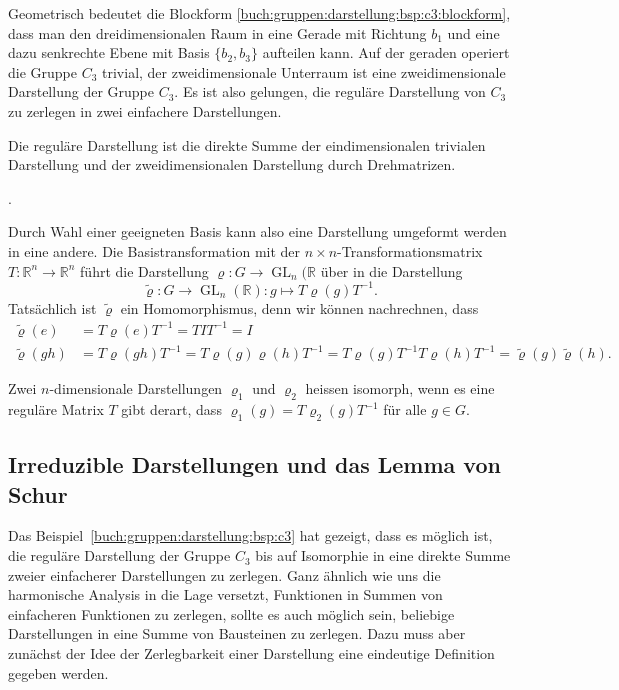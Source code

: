 \begin{beispiel}
Geometrisch bedeutet die Blockform
\eqref{buch:gruppen:darstellung:bsp:c3:blockform}, dass man den
dreidimensionalen Raum in eine Gerade mit Richtung $b_1$ und
eine dazu senkrechte Ebene mit Basis $\{b_2,b_3\}$ aufteilen
kann.
Auf der geraden operiert die Gruppe $C_3$ trivial, der zweidimensionale
Unterraum ist eine zweidimensionale Darstellung der Gruppe $C_3$.
Es ist also gelungen, die reguläre Darstellung von $C_3$ zu zerlegen
in zwei einfachere Darstellungen.

Die reguläre Darstellung ist die direkte Summe der eindimensionalen
trivialen Darstellung und der zweidimensionalen Darstellung durch
Drehmatrizen.
\end{beispiel}.

Durch Wahl einer geeigneten Basis kann also eine Darstellung umgeformt
werden in eine andere.
Die Basistransformation mit der $n\times n$-Transformationsmatrix
$T:\mathbb{R}^n\to\mathbb{R}^n$ führt die 
Darstellung $\varrho\colon G\to\operatorname{GL}_n(\mathbb{R}$ über
in die Darstellung
\[
\tilde{\varrho}
\colon
G\to\operatorname{GL}_n(\mathbb{R})
:
g\mapsto T\varrho(g)T^{-1}.
\]
Tatsächlich ist $\tilde{\varrho}$ ein Homomorphismus, denn wir können
nachrechnen, dass
\begin{align*}
\tilde{\varrho}(e)
&=
T\varrho(e)T^{-1}
=
TIT^{-1}
=
I
\\
\tilde{\varrho}(gh)
&=
T\varrho(gh)T^{-1}
=
T\varrho(g)\varrho(h)T^{-1}
=
T\varrho(g)T^{-1}T\varrho(h)T^{-1}
=
\tilde{\varrho}(g)
\tilde{\varrho}(h).
\end{align*}

\begin{definition}
Zwei $n$-dimensionale Darstellungen $\varrho_1$ und $\varrho_2$
heissen isomorph, wenn es eine reguläre Matrix $T$ gibt derart, dass
$\varrho_1(g)=T\varrho_2(g)T^{-1}$ für alle $g\in G$.
\end{definition}

%
%
\subsection{Irreduzible Darstellungen und das Lemma von Schur}
Das Beispiel~\ref{buch:gruppen:darstellung:bsp:c3} hat gezeigt, dass
es möglich ist, die reguläre Darstellung der Gruppe $C_3$ bis auf
Isomorphie in eine direkte Summe zweier einfacherer Darstellungen
zu zerlegen.
Ganz ähnlich wie uns die harmonische Analysis in die Lage versetzt,
Funktionen in Summen von einfacheren Funktionen zu zerlegen, sollte
es auch möglich sein, beliebige Darstellungen in eine Summe von
Bausteinen zu zerlegen.
Dazu muss aber zunächst der Idee der Zerlegbarkeit einer Darstellung
eine eindeutige Definition gegeben werden.

